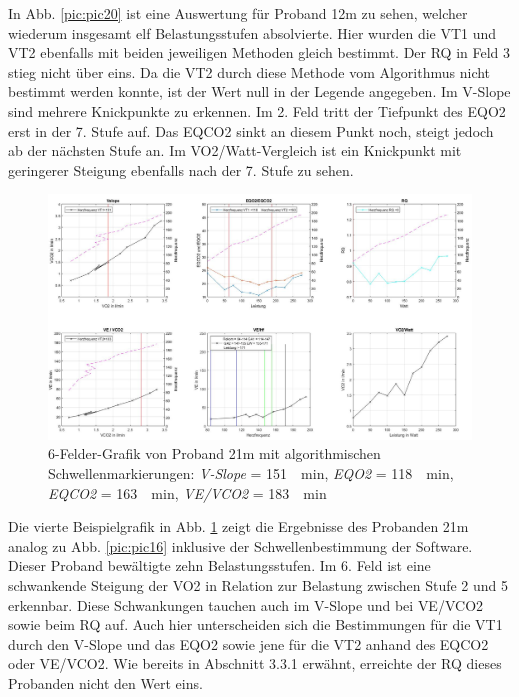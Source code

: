 %
In Abb. \ref{pic:pic20} ist eine Auswertung für Proband 12m zu sehen, welcher wiederum insgesamt elf Belastungsstufen absolvierte. Hier wurden die VT1 und VT2 ebenfalls mit beiden jeweiligen Methoden gleich bestimmt. Der RQ in Feld 3 stieg nicht über eins. Da die VT2 durch diese Methode vom Algorithmus nicht bestimmt werden konnte, ist der Wert null in der Legende angegeben. Im V-Slope sind mehrere Knickpunkte zu erkennen. Im 2. Feld tritt der Tiefpunkt des \acs{EQO2} erst in der 7. Stufe auf. Das \acs{EQCO2} sinkt an diesem Punkt noch, steigt jedoch ab der nächsten Stufe an. Im \acs{VO2}/Watt-Vergleich ist ein Knickpunkt mit geringerer Steigung ebenfalls nach der 7. Stufe zu sehen.
%
\begin{figure}[H]
	\centering
	\noindent\includegraphics[angle=0,width=\linewidth,keepaspectratio]{Bilder/auto_21}
	\caption[6-Felder-Grafik von Proband 21m mit algorithmischen Schwellenmarkierungen]{6-Felder-Grafik von Proband 21m mit algorithmischen Schwellenmarkierungen: \textsl{V-Slope} = \SI{151}{\per\minute}, \textsl{\acs{EQO2}} = \SI{118}{\per\minute}, \textsl{\acs{EQCO2}} = \SI{163}{\per\minute}, \textsl{\acs{VE}/\acs{VCO2}} = \SI{183}{\per\minute}}
	\label{pic:pic21}
\end{figure}
%
Die vierte Beispielgrafik in Abb. \ref{pic:pic21} zeigt die Ergebnisse des Probanden 21m analog zu Abb. \ref{pic:pic16} inklusive der Schwellenbestimmung der Software. Dieser Proband bewältigte zehn Belastungsstufen. Im 6. Feld ist eine schwankende Steigung der \acs{VO2} in Relation zur Belastung zwischen Stufe 2 und 5 erkennbar. Diese Schwankungen tauchen auch im V-Slope und bei \acs{VE}/\acs{VCO2} sowie beim RQ auf. Auch hier unterscheiden sich die Bestimmungen für die VT1 durch den V-Slope und das \acs{EQO2} sowie jene für die VT2 anhand des \acs{EQCO2} oder \acs{VE}/\acs{VCO2}. Wie bereits in Abschnitt 3.3.1 erwähnt, erreichte der RQ dieses Probanden nicht den Wert eins.
%
